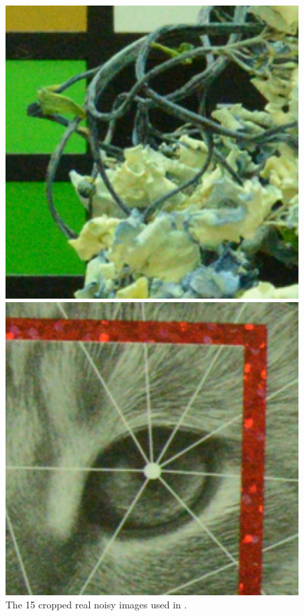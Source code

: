 \documentclass[10pt,twocolumn,letterpaper,sort&compress]{article}
\begin{document}
\begin{figure}
{\begin{minipage}{0.085\textwidth}
\end{minipage}
\begin{minipage}{0.085\textwidth}
\includegraphics[width=1\textwidth]{CC15images/resize_d800_iso6400_2_real.png}
\end{minipage}
\begin{minipage}{0.085\textwidth}
\includegraphics[width=1\textwidth]{CC15images/resize_d800_iso6400_3_real.png}
\end{minipage}
}\vspace{-1mm}
\caption{The 15 cropped real noisy images used in \cite{crosschannel2016}.}
\label{f4}
\vspace{-3mm}
\end{figure}
\end{document}
